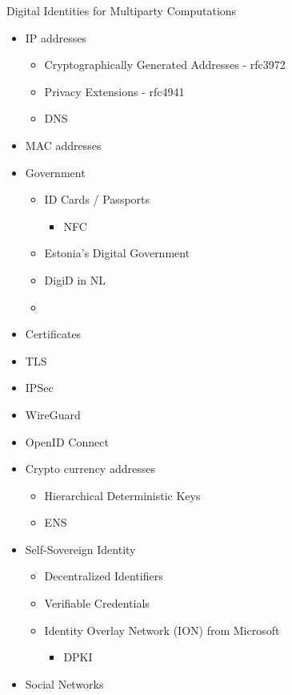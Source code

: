 \begin{block}{Digital Identities for Multiparty Computations}
\begin{itemize}
\tightlist
\item
  IP addresses

  \begin{itemize}
  \tightlist
  \item
    Cryptographically Generated Addresses - rfc3972
  \item
    Privacy Extensions - rfc4941
  \item
    DNS
  \end{itemize}
\item
  MAC addresses
\item
  Government

  \begin{itemize}
  \tightlist
  \item
    ID Cards / Passports

    \begin{itemize}
    \tightlist
    \item
      NFC
    \end{itemize}
  \item
    Estonia's Digital Government
  \item
    DigiD in NL
  \item
  \end{itemize}
\item
  Certificates
\item
  TLS
\item
  IPSec
\item
  WireGuard
\item
  OpenID Connect
\item
  Crypto currency addresses

  \begin{itemize}
  \tightlist
  \item
    Hierarchical Deterministic Keys
  \item
    ENS
  \end{itemize}
\item
  Self-Sovereign Identity

  \begin{itemize}
  \tightlist
  \item
    Decentralized Identifiers
  \item
    Verifiable Credentials
  \item
    Identity Overlay Network (ION) from Microsoft

    \begin{itemize}
    \tightlist
    \item
      DPKI
    \end{itemize}
  \end{itemize}
\item
  Social Networks


\end{itemize}
\end{block}
